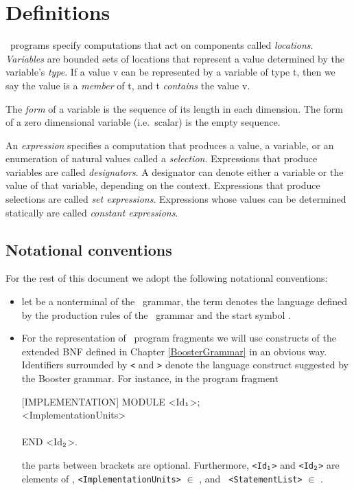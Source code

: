\section{Definitions}

\Booster\ programs specify computations that act on components
called {\em locations}. {\em Variables\/} are bounded sets of
locations that represent a value determined by the variable's {\em
type}. If a value {\sc v} can be represented by a variable of type
{\sc t}, then we say the value is a {\em member} of {\sc t}, and {\sc
t} {\em contains} the value {\sc v}.

The {\em form} of a variable is the sequence of its length in each
dimension. The form of a zero dimensional variable (i.e.\ scalar) is
the empty sequence.

An {\em expression\/} specifies a computation that produces a value, a
variable, or an enumeration of natural values called a {\em
selection}. Expressions that produce variables are called {\em
designators}. A designator can denote either a variable or the value
of that variable, depending on the context. Expressions that produce
selections are called {\em set expressions}. Expressions whose values
can be determined statically are called {\em constant expressions}.

\subsection*{Notational conventions}

For the rest of this document we adopt the following notational
conventions: 

\begin{itemize}

\item let  be a nonterminal of the \Booster\ grammar, the term
 denotes the language defined by the production
rules of the \Booster\ grammar and the start symbol .

\item For the representation of \Booster\ program fragments we will use
constructs of the extended BNF defined in Chapter \ref{BoosterGrammar}
in an obvious way. Identifiers surrounded by \verb'<' and \verb'>'
denote the language construct suggested by the Booster grammar. For
instance, in the program fragment

\begin{frag}
{[}IMPLEMENTATION{]} MODULE <Id$_{\tt 1}$>;\\
\> <ImplementationUnits>\\
\\
END <Id$_{\tt 2}$>.
\end{frag}

\noindent the parts between brackets are optional. Furthermore, {\small
\tt <Id$_{\tt 1}$>} and {\small \tt <Id$_{\tt 2}$>} are elements of
, {\small \tt <ImplementationUnits>} $\in$
, and {\small \tt
<StatementList>} $\in$ .

\end{itemize}

